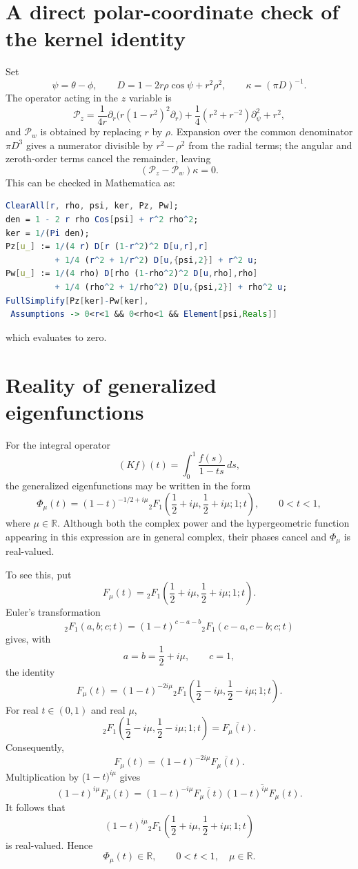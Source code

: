 \IfFileExists{iopjournal.cls}{\documentclass{iopjournal}}{\documentclass{iopjournal-draft}}
\theoremstyle{definition}
\theoremstyle{remark}
\numberwithin{equation}{section}
\begin{document}
\appendix
\section{A direct polar-coordinate check of the kernel identity}
\label{app:polar-check}

Set
\[
 \psi=\theta-\phi,\qquad
 D=1-2r\rho\cos\psi+r^2\rho^2,
 \qquad \kappa=(\pi D)^{-1}.
\]
The operator acting in the $z$ variable is
\[
 \mathcal P_z=
 \frac1{4r}\partial_r\bigl(r(1-r^2)^2\partial_r\bigr)
 +\frac14(r^2+r^{-2})\partial_\psi^2+r^2,
\]
and $\mathcal P_w$ is obtained by replacing $r$ by $\rho$.  Expansion over the common denominator $\pi D^3$ gives a numerator divisible by $r^2-\rho^2$ from the radial terms; the angular and zeroth-order terms cancel the remainder, leaving
\[
 (\mathcal P_z-\mathcal P_w)\kappa=0.
\]
This can be checked in Mathematica as:
\begin{lstlisting}[language=Mathematica,basicstyle=\ttfamily\footnotesize,frame=single,breaklines=true]
ClearAll[r, rho, psi, ker, Pz, Pw];
den = 1 - 2 r rho Cos[psi] + r^2 rho^2;
ker = 1/(Pi den);
Pz[u_] := 1/(4 r) D[r (1-r^2)^2 D[u,r],r]
          + 1/4 (r^2 + 1/r^2) D[u,{psi,2}] + r^2 u;
Pw[u_] := 1/(4 rho) D[rho (1-rho^2)^2 D[u,rho],rho]
          + 1/4 (rho^2 + 1/rho^2) D[u,{psi,2}] + rho^2 u;
FullSimplify[Pz[ker]-Pw[ker],
 Assumptions -> 0<r<1 && 0<rho<1 && Element[psi,Reals]]
\end{lstlisting}
which evaluates to zero. 



\section{Reality of generalized eigenfunctions}


For the integral operator
\[
(Kf)(t)=\int_0^1\frac{f(s)}{1-ts}\,ds,
\]
the generalized eigenfunctions may be written in the form
\[
\Phi_\mu(t)
=
(1-t)^{-1/2+i\mu}
{}_2F_1\left(
\frac12+i\mu,\frac12+i\mu;
1;t
\right),
\qquad
0<t<1,
\]
where \(\mu\in\mathbb{R}\). Although both the complex power and the hypergeometric function appearing in this expression are in general complex, their phases cancel and \(\Phi_\mu\) is real-valued.

To see this, put
\[
F_\mu(t)
=
{}_2F_1\left(
\frac12+i\mu,\frac12+i\mu;
1;t
\right).
\]
Euler's transformation
\[
{}_2F_1(a,b;c;t)
=
(1-t)^{c-a-b}
{}_2F_1(c-a,c-b;c;t)
\]
gives, with
\[
a=b=\frac12+i\mu,
\qquad c=1,
\]
the identity
\[
F_\mu(t)
=
(1-t)^{-2i\mu}
{}_2F_1\left(
\frac12-i\mu,\frac12-i\mu;
1;t
\right).
\]
For real \(t\in(0,1)\) and real \(\mu\),
\[
{}_2F_1\left(
\frac12-i\mu,\frac12-i\mu;
1;t
\right)
=
\overline{F_\mu(t)}.
\]
Consequently,
\[
F_\mu(t)
=
(1-t)^{-2i\mu}\overline{F_\mu(t)}.
\]
Multiplication by (\(1-t)^{i\mu}\) gives
\[
(1-t)^{i\mu}F_\mu(t)
=
(1-t)^{-i\mu}\overline{F_\mu(t)}
\overline{(1-t)^{i\mu}F_\mu(t)}.
\]
It follows that
\[
(1-t)^{i\mu}
{}_2F_1\left(
\frac12+i\mu,\frac12+i\mu;
1;t
\right)
\]
is real-valued. Hence
\[
\Phi_\mu(t)\in\mathbb{R},
\qquad 0<t<1,\quad \mu\in\mathbb{R}.
\]
\end{document}
